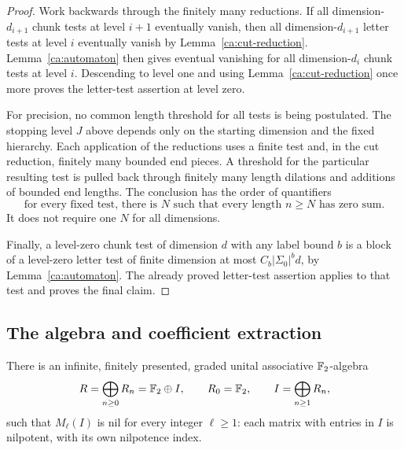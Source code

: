 \begin{proof}
Work backwards through the finitely many reductions.  If all
dimension-$d_{i+1}$ chunk tests at level $i+1$ eventually vanish, then all
dimension-$d_{i+1}$ letter tests at level $i$ eventually vanish by
Lemma~\ref{ca:cut-reduction}.  Lemma~\ref{ca:automaton} then gives
eventual vanishing for all dimension-$d_i$ chunk tests at level $i$.
Descending to level one and using Lemma~\ref{ca:cut-reduction} once more
proves the letter-test assertion at level zero.

For precision, no common length threshold for all tests is being
postulated.  The stopping level $J$ above depends only on the starting
dimension and the fixed hierarchy.  Each application of the reductions
uses a finite test and, in the cut reduction, finitely many bounded end
pieces.  A threshold for the particular resulting test is pulled back
through finitely many length dilations and additions of bounded end
lengths.  The conclusion has the order of quantifiers
\[
  \text{for every fixed test, there is }N
  \text{ such that every length }n\geq N\text{ has zero sum}.
\]
It does not require one $N$ for all dimensions.

Finally, a level-zero chunk test of dimension $d$ with any label bound
$b$ is a block of a level-zero letter test of finite dimension at most
$C_b|\Sigma_0|^bd$, by Lemma~\ref{ca:automaton}.  The already proved
letter-test assertion applies to that test and proves the final claim.
\end{proof}

\subsection{The algebra and coefficient extraction}

\begin{theorem}
\label{thm:algebra}
There is an infinite, finitely presented, graded unital associative
$\mathbb F_2$-algebra
\[
  R=\bigoplus_{n\geq0}R_n=\mathbb F_2\oplus I,
  \qquad R_0=\mathbb F_2,\qquad I=\bigoplus_{n\geq1}R_n,
\]
such that $M_\ell(I)$ is nil for every integer $\ell\geq1$: each matrix
with entries in $I$ is nilpotent, with its own nilpotence index.
\end{theorem}

